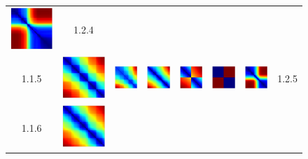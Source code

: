 \documentclass[bachelor, nocolorlinks, printoneside]{seuthesis} %
\begin{document}
\begin{Main}
\begin{figure}[ht!]
\begin{centering}
\begin{tabular}{cccc|cccc}
        \includegraphics[width=0.12\columnwidth,keepaspectratio]{figs/toyset_matrices/cluster_2by10_4_3.png} & 1.2.4\\
        1.1.5 &\includegraphics[width=0.12\columnwidth,keepaspectratio]{figs/toyset_matrices/cluster_5by20_5_1.png} &
        \includegraphics[width=0.12\columnwidth,keepaspectratio]{figs/toyset_matrices/cluster_5by20_5_2.png} &
        \includegraphics[width=0.12\columnwidth,keepaspectratio]{figs/toyset_matrices/cluster_5by20_5_3.png} &  
        \includegraphics[width=0.12\columnwidth,keepaspectratio]{figs/toyset_matrices/cluster_2by10_5_1.png} &
        \includegraphics[width=0.12\columnwidth,keepaspectratio]{figs/toyset_matrices/cluster_2by10_5_2.png} &
        \includegraphics[width=0.12\columnwidth,keepaspectratio]{figs/toyset_matrices/cluster_2by10_5_3.png}& 1.2.5\\
        1.1.6 &\includegraphics[width=0.12\columnwidth,keepaspectratio]{figs/toyset_matrices/cluster_5by20_6_1.png} &

\end{tabular}
\end{centering}
\end{figure}
\end{Main}
\end{document}

